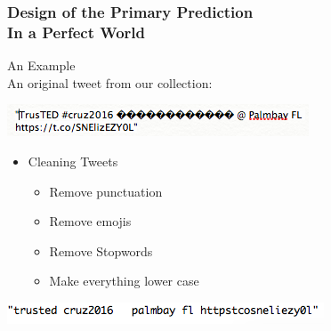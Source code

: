 \documentclass[xcolor=dvipsnames]{beamer}
\begin{document}

\begin{frame}
\frametitle{Design of the Primary Prediction \\ \small In a Perfect World}
\large{An Example}\\
 An original tweet from our collection: 
\begin{center}
\includegraphics[scale=0.5]{uncleantweets3.png}
\end{center} \pause 
	\begin{itemize}
	\item Cleaning Tweets
	\begin{itemize}
		\item Remove punctuation \pause
		\item Remove emojis \pause 
		\item Remove Stopwords \pause 
		\item Make everything lower case \pause 
	\end{itemize}
	\end{itemize}
\begin{center}
\includegraphics[scale=0.5]{CleanTweet.png}
\end{center}
\end{frame}
\end{document}
